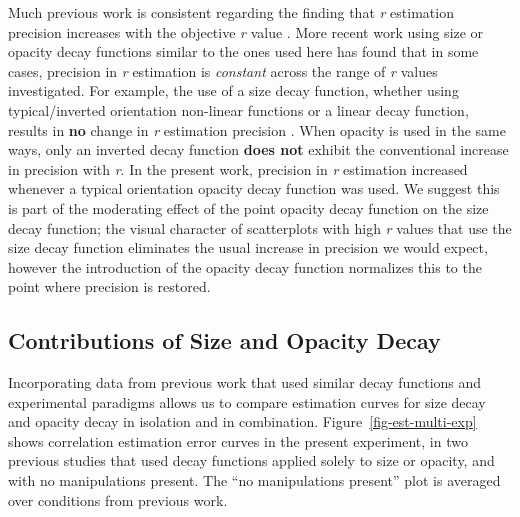 \documentclass[manuscript, review, anonymous, screen]{acmart}
\begin{document}
Much previous work is consistent regarding the finding that \emph{r}
estimation precision increases with the objective \emph{r} value
\citep{rensink_2010, rensink_2012, rensink_2014, rensink_2017, doherty_2007}.
More recent work using size or opacity decay functions similar to the
ones used here \citep{strain_2023, strain_2023b} has found that in some
cases, precision in \emph{r} estimation is \emph{constant} across the
range of \emph{r} values investigated. For example, the use of a size
decay function, whether using typical/inverted orientation non-linear
functions or a linear decay function, results in \textbf{no} change in
\emph{r} estimation precision \citep{strain_2023b}. When opacity is used
in the same ways, only an inverted decay function \textbf{does not}
exhibit the conventional increase in precision with \emph{r}. In the
present work, precision in \emph{r} estimation increased whenever a
typical orientation opacity decay function was used. We suggest this is
part of the moderating effect of the point opacity decay function on the
size decay function; the visual character of scatterplots with high
\emph{r} values that use the size decay function eliminates the usual
increase in precision we would expect, however the introduction of the
opacity decay function normalizes this to the point where precision is
restored.

\hypertarget{contributions-of-size-and-opacity-decay}{%
\subsection{Contributions of Size and Opacity
Decay}\label{contributions-of-size-and-opacity-decay}}

Incorporating data from previous work \citep{strain_2023, strain_2023b}
that used similar decay functions and experimental paradigms allows us
to compare estimation curves for size decay and opacity decay in
isolation and in combination. Figure~\ref{fig-est-multi-exp} shows
correlation estimation error curves in the present experiment, in two
previous studies that used decay functions applied solely to size or
opacity, and with no manipulations present. The ``no manipulations
present'' plot is averaged over conditions from previous work.
\end{document}
